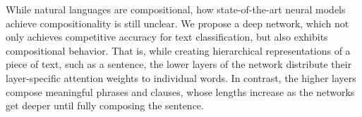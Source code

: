 While natural languages are compositional, how state-of-the-art neural models achieve compositionality is still unclear. We propose a deep network, which not only achieves competitive accuracy for text classification, but also exhibits compositional behavior. That is, while creating hierarchical representations of a piece of text, such as a sentence, the lower layers of the network distribute their layer-specific attention weights to individual words. In contrast, the higher layers compose meaningful phrases and clauses, whose lengths increase as the networks get deeper until fully composing the sentence.
